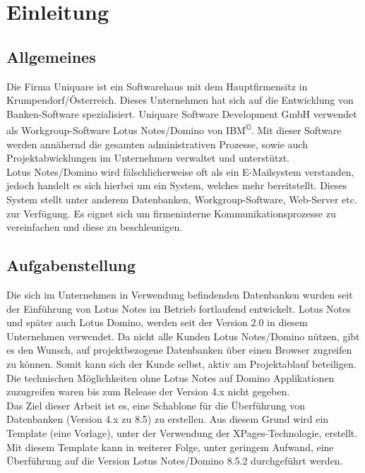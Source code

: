 

\chapter{Einleitung}

\section{Allgemeines}
\label{sec:1einleitung}


\vspace{0.5cm}
\par Die Firma Uniquare ist ein Softwarehaus mit dem Hauptfirmensitz in Krumpendorf/Österreich. Dieses Unternehmen 
hat sich auf die Entwicklung von Banken-Software spezialisiert. \linebreak
Uniquare Software Development GmbH verwendet als Workgroup-Software Lotus \linebreak Notes/Domino von IBM\textsuperscript{\copyright}.
Mit dieser Software werden annähernd die gesamten \linebreak administrativen Prozesse, sowie auch Projektabwicklungen im Unternehmen verwaltet und
\linebreak unterstützt.\\
Lotus Notes/Domino wird fälschlicherweise oft als ein E-Mailsystem verstanden, jedoch handelt es sich hierbei um ein System, welches 
mehr bereitstellt. Dieses System stellt unter anderem Datenbanken, Workgroup-Software, Web-Server etc. zur Verfügung. Es
eignet sich um firmeninterne Kommunikationsprozesse zu vereinfachen und diese zu beschleunigen\cite{muhs/klatt}.


\vspace{0.3cm}


\section{Aufgabenstellung}
\label{sec:1einleitung}

\par Die sich im Unternehmen in Verwendung befindenden Datenbanken wurden seit der Einführung von Lotus Notes im Betrieb fortlaufend entwickelt.  
Lotus Notes und später auch Lotus Domino, werden seit der Version 2.0 in diesem Unternehmen verwendet. \newline
Da nicht alle Kunden Lotus Notes/Domino n\"utzen, gibt es den Wunsch, auf projektbezogene Datenbanken \"uber einen Browser
zugreifen zu k\"onnen. Somit kann sich der Kunde selbst, aktiv am Projektablauf beteiligen. 
Die technischen M\"oglichkeiten ohne Lotus Notes auf Domino Applikationen
zuzugreifen waren bis zum Release der Version 4.x nicht gegeben.\\
Das Ziel dieser Arbeit ist es, eine Schablone für die Überführung von Datenbanken (Version 4.x zu 8.5) zu erstellen.
Aus diesem Grund wird ein Template (eine Vorlage), unter der Verwendung der XPages-Technologie, erstellt.
Mit diesem Template kann in weiterer Folge, unter geringem Aufwand, eine Überführung auf die Version Lotus Notes/Domino 8.5.2 durchgeführt werden.



